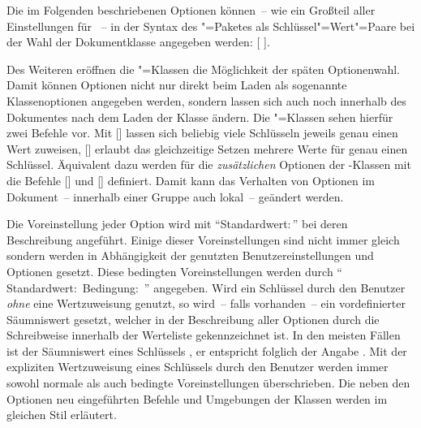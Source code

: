 Die im Folgenden beschriebenen Optionen können~-- wie ein Großteil aller 
Einstellungen für \KOMAScript~-- in der Syntax des "=Paketes 
als Schlüssel"=Wert"=Paare bei der Wahl der Dokumentklasse angegeben werden:
[%
].

Des Weiteren eröffnen die \KOMAScript"=Klassen die Möglichkeit der späten 
Optionenwahl. Damit können Optionen nicht nur direkt beim Laden als sogenannte 
Klassenoptionen angegeben werden, sondern lassen sich auch noch innerhalb des 
Dokumentes nach dem Laden der Klasse ändern. Die \KOMAScript"=Klassen sehen 
hierfür zwei Befehle vor. Mit []
lassen sich beliebig viele Schlüsseln jeweils genau einen Wert zuweisen, 
[] erlaubt das 
gleichzeitige Setzen mehrere Werte für genau einen Schlüssel. Äquivalent 
dazu werden für die \emph{zusätzlichen} Optionen der \TUDScript-Klassen mit 
die Befehle [] und 
[] definiert. Damit 
kann das Verhalten von Optionen im Dokument~-- innerhalb einer Gruppe auch 
lokal~-- geändert werden.

Die Voreinstellung jeder Option wird mit \enquote{Standardwert:\,} 
bei deren Beschreibung angeführt. Einige dieser Voreinstellungen sind nicht 
immer gleich sondern werden in Abhängigkeit der genutzten Benutzereinstellungen 
und Optionen gesetzt. Diese bedingten Voreinstellungen werden durch 
\enquote{%
  Standardwert:\,%
  \PValue{\,|\,}Bedingung:\,%
}
angegeben. Wird ein Schlüssel durch den Benutzer \emph{ohne} eine Wertzuweisung 
genutzt, so wird~-- falls vorhanden~-- ein vordefinierter Säumniswert gesetzt, 
welcher in der Beschreibung aller Optionen durch die~ 
Schreibweise innerhalb der Werteliste gekennzeichnet ist. In den meisten Fällen 
ist der Säumniswert eines Schlüssels , er entspricht folglich der 
Angabe . Mit der expliziten Wertzuweisung eines 
Schlüssels durch den Benutzer werden immer sowohl normale als auch bedingte 
Voreinstellungen überschrieben. Die neben den Optionen neu eingeführten Befehle 
und Umgebungen der Klassen werden im gleichen Stil erläutert.




